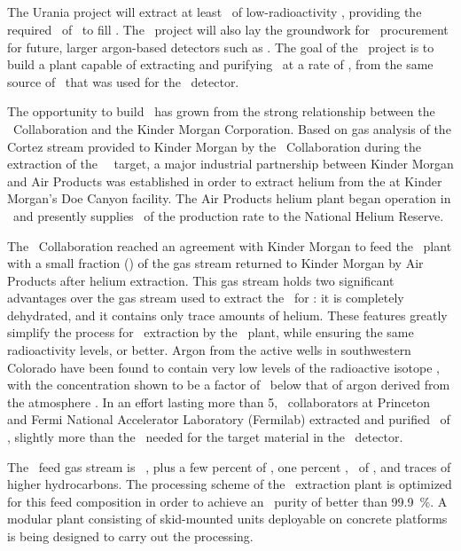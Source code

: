 \subsection{\Urania}
The Urania project will extract at least \UraniaTotalDSkProduction\ of low-radioactivity \UAr, providing the required \DSkTotalMass\ of \UAr\ to fill \DSk.   The \Urania\ project will also lay the groundwork for \UAr\ procurement for future, larger argon-based detectors such as \Argo.  The goal of the \Urania\ project is to build a plant capable of extracting and purifying \UAr\ at a rate of \UraniaUArRate, from the same source of \UAr\ that was used for the \DSf\ detector.  

The opportunity to build \Urania\ has grown from the strong relationship between the \DS\ Collaboration and the Kinder Morgan Corporation. Based on gas analysis of the Cortez stream provided to Kinder Morgan by the \DS\ Collaboration during the extraction of the \DSf\ \UAr\ target, a major industrial partnership between Kinder Morgan and Air Products was established in order to extract helium from the  at Kinder Morgan's Doe Canyon facility.  The Air Products helium plant began operation in \UraniaHeStartDate\ and presently supplies \UraniaHeNationalReserveFractionEquivalentRate\ of the production rate to the National Helium Reserve. 

The \DS\ Collaboration reached an agreement with Kinder Morgan to feed the \Urania\ plant with a small fraction (\UraniaGasFeedFraction) of the gas stream returned to Kinder Morgan by Air Products after helium extraction.  This gas stream holds two significant advantages over the gas stream used to extract the \UAr\ for \DSf: it is completely dehydrated,  and it contains only trace amounts of helium. These features greatly simplify the process for \UAr\ extraction by the \Urania\ plant, while ensuring the same radioactivity levels, or better.  Argon from the active  wells in southwestern Colorado have been found to contain very low levels of the radioactive isotope  , with the concentration shown to be a factor of \DSfUArArThreeNineDepletion\ below that of argon derived from the atmosphere \cite{Agnes:2016fz}. In an effort lasting more than \SI{5}{\years}, \DSf\ collaborators at Princeton and Fermi National Accelerator Laboratory (Fermilab) extracted and purified \DSfUArMassDelivered\ of \UAr, slightly more than the  \DSfTotalMass\ needed for the target material in the \DSf\ detector. 

The \Urania\ feed gas stream is \UraniaCOTwoFeedFraction\ , plus a few percent of , one percent , \UraniaArFeedFraction\ of \UAr, and traces of higher hydrocarbons.  The processing scheme of the \UAr\ extraction plant is optimized for this feed composition in order to achieve an \UAr\ purity of better than \SI{99.9}{\percent}.  A modular plant consisting of skid-mounted units deployable on concrete platforms is being designed to carry out the processing.

